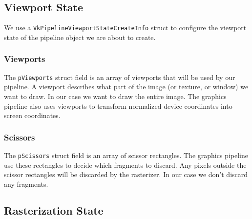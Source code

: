 \subsection{Viewport State}

We use a \texttt{VkPipelineViewportStateCreateInfo} struct to configure
the viewport state of the pipeline object we are about to create.

\begin{minipage}{\linewidth}{\noindent}
    
\end{minipage}

\subsubsection{Viewports}

The \texttt{pViewports} struct field
is an array of viewports that will be used by our pipeline.
A viewport describes what part of the image (or texture, or window) we want to draw.
In our case we want to draw the entire image.
The graphics pipeline also uses viewports to transform normalized device
coordinates into screen coordinates.

\begin{minipage}{\linewidth}{\noindent}
    
\end{minipage}

\subsubsection{Scissors}

The \texttt{pScissors} struct field
is an array of scissor rectangles.
The graphics pipeline use these rectangles to decide which fragments to discard.
Any pixels outside the scissor rectangles will be discarded by the rasterizer.
In our case we don't discard any fragments.

\begin{minipage}{\linewidth}{\noindent}
    
\end{minipage}

\subsection{Rasterization State}

